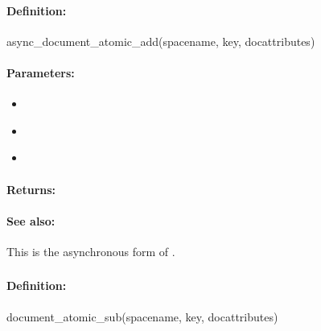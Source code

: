 \paragraph{Definition:}
\begin{rubycode}
async_document_atomic_add(spacename, key, docattributes)
\end{rubycode}

\paragraph{Parameters:}
\begin{itemize}[noitemsep]
\item {}\\

\item {}\\

\item {}\\

\end{itemize}

\paragraph{Returns:}


\paragraph{See also:}  This is the asynchronous form of .

\pagebreak
\subsubsection{}
\label{api:ruby:document_atomic_sub}


\paragraph{Definition:}
\begin{rubycode}
document_atomic_sub(spacename, key, docattributes)
\end{rubycode}

